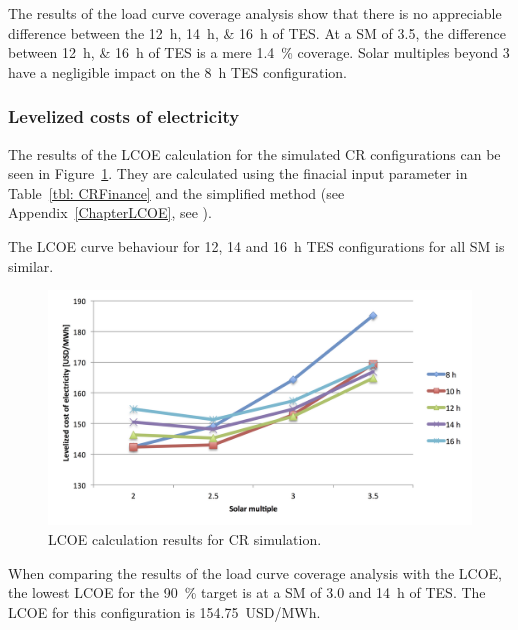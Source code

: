 The results of the load curve coverage analysis show that there is no appreciable difference between the \SIlist{12;14;16}{h} of TES. At a SM of 3.5, the difference between \SIlist{12;16}{h} of TES is a mere \SI{1.4}{\percent} coverage. Solar multiples beyond 3 have a negligible impact on the \SI{8}{h} TES configuration.

\subsubsection{Levelized costs of electricity}

The results of the LCOE calculation for the simulated CR configurations can be seen in Figure~\ref{CR_LCOE}. They are calculated using the finacial input parameter in Table~\ref{tbl: CRFinance} and the simplified method (see Appendix~\ref{ChapterLCOE}, see \pageref{ChapterLCOE}). 

The LCOE curve behaviour for 12, 14 and \SI{16}{h} TES configurations for all SM is similar.

\begin{figure}[htbp]  
\centering
\includegraphics[width=1\linewidth]{FIG/CR_LCOE}
\caption[LCOE calculation results for CR simulation.]{LCOE calculation results for CR simulation.}\label{CR_LCOE}
\end{figure}

When comparing the results of the load curve coverage analysis with the LCOE, the lowest LCOE for the \SI{90}{\percent} target is at a SM of 3.0 and \SI{14}{h} of TES. The LCOE for this configuration is \SI{154.75}{USD/MWh}.

